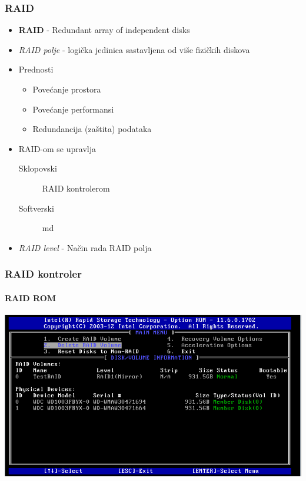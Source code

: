 \documentclass[t]{beamer}
\begin{document}
\begin{frame}
	\frametitle{RAID}
	\begin{itemize}
		\item \textbf{RAID} - Redundant array of independent disks
	\end{itemize}
	\begin{itemize}
		\item \emph{RAID polje} - logička jedinica sastavljena od više fizičkih diskova
		\item Prednosti
		\begin{itemize}
			\item Povećanje prostora
			\item Povećanje performansi
			\item Redundancija (zaštita) podataka
		\end{itemize}
	\end{itemize}
	\begin{itemize}
		\item RAID-om se upravlja
		\begin{description}
			\item[Sklopovski] RAID kontrolerom
			\item[Softverski] md
		\end{description}
	\end{itemize}
	\begin{itemize}
		\item \emph{RAID level} - Način rada RAID polja
	\end{itemize}
\end{frame}

\begin{frame}
	\frametitle{RAID kontroler}
	\framesubtitle{RAID ROM}
	\includegraphics[width=\textwidth]{Intel_RAID.png}
\end{frame}
\end{document}
